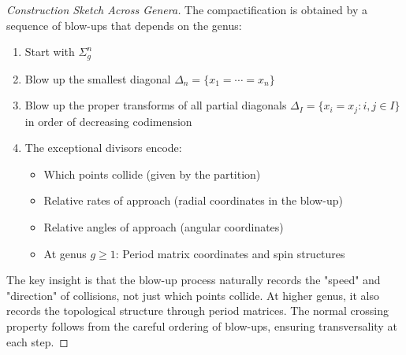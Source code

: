 \begin{proof}[Construction Sketch Across Genera]
The compactification is obtained by a sequence of blow-ups that depends on the genus:
\begin{enumerate}
\item Start with $\Sigma_g^n$
\item Blow up the smallest diagonal $\Delta_n = \{x_1 = \cdots = x_n\}$
\item Blow up the proper transforms of all partial diagonals $\Delta_I = \{x_i = x_j : i,j \in I\}$ in order of decreasing codimension
\item The exceptional divisors encode:
\begin{itemize}
\item Which points collide (given by the partition)
\item Relative rates of approach (radial coordinates in the blow-up)
\item Relative angles of approach (angular coordinates)
\item At genus $g \geq 1$: Period matrix coordinates and spin structures
\end{itemize}
\end{enumerate}
 
The key insight is that the blow-up process naturally records the "speed" and "direction" of collisions, not just which points collide. At higher genus, it also records the topological structure through period matrices. The normal crossing property follows from the careful ordering of blow-ups, ensuring transversality at each step.
\end{proof}
 
